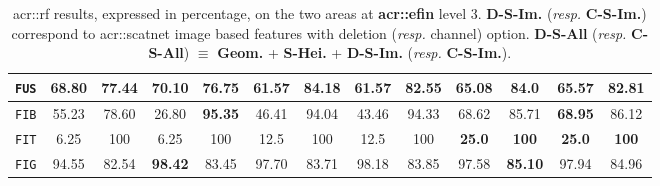 \begin{table}[htpb]
\begin{center}
\begin{tabular}{| c | c c | c c | c c | c c | c c | c c |}
                        \hline
                        \texttt{FUS} & 68.80 & 77.44 & \textbf{70.10} & 76.75 & 61.57 & \textbf{84.18} & 61.57 & 82.55 & 65.08 & 84.0 & 65.57 & 82.81 \\
                        \hline
                        \texttt{FIB} & 55.23 & 78.60 & 26.80 & \textbf{95.35} & 46.41 & 94.04 & 43.46 & 94.33 & 68.62 & 85.71 & \textbf{68.95} & 86.12 \\
                        \hline
                        \texttt{FIT} & 6.25 & 100 & 6.25 & 100 & 12.5 & 100 & 12.5 & 100 & \textbf{25.0} & \textbf{100} & \textbf{25.0} & \textbf{100} \\
                        \hline
                        \texttt{FIG} & 94.55 & 82.54 & \textbf{98.42} & 83.45 & 97.70 & 83.71 & 98.18 & 83.85 & 97.58 & \textbf{85.10} & 97.94 & 84.96 \\
                        \hline
                    \end{tabular}
                \end{center}
                \caption{
                    \label{tab::stats_scat_rf_f3}
                    \gls{acr::rf} results, expressed in percentage, on the two areas at \textbf{\gls{acr::efin}} level 3.
                    \textbf{D-S-Im.} (\textit{resp.} \textbf{C-S-Im.}) correspond to \gls{acr::scatnet} image based features with deletion (\textit{resp.} channel) option.
                    \textbf{D-S-All} (\textit{resp.} \textbf{C-S-All}) \(\equiv\) \textbf{Geom.} + \textbf{S-Hei.} + \textbf{D-S-Im.} (\textit{resp.} \textbf{C-S-Im.}).
                }
            \end{table}
